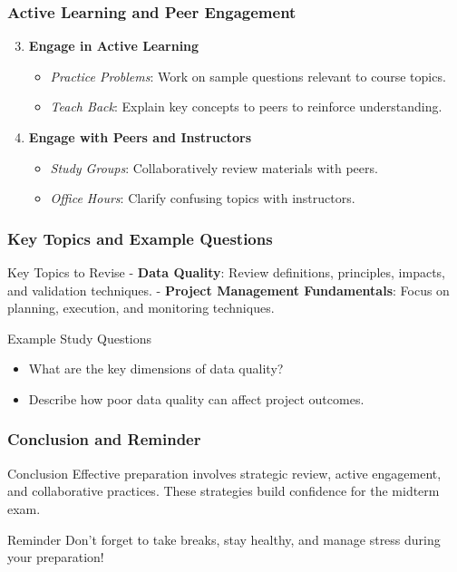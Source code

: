 \documentclass[aspectratio=169]{beamer}
\begin{document}
\begin{frame}[fragile]
    \frametitle{Active Learning and Peer Engagement}
    \begin{enumerate}
        \setcounter{enumi}{2}
        \item \textbf{Engage in Active Learning}
            \begin{itemize}
                \item \textit{Practice Problems}: Work on sample questions relevant to course topics.
                \item \textit{Teach Back}: Explain key concepts to peers to reinforce understanding.
            \end{itemize}        
        \item \textbf{Engage with Peers and Instructors}
            \begin{itemize}
                \item \textit{Study Groups}: Collaboratively review materials with peers.
                \item \textit{Office Hours}: Clarify confusing topics with instructors.
            \end{itemize}
    \end{enumerate}
\end{frame}

\begin{frame}[fragile]
    \frametitle{Key Topics and Example Questions}
    \begin{block}{Key Topics to Revise}
        - \textbf{Data Quality}: Review definitions, principles, impacts, and validation techniques.
        - \textbf{Project Management Fundamentals}: Focus on planning, execution, and monitoring techniques.
    \end{block}

    \begin{block}{Example Study Questions}
        \begin{itemize}
            \item What are the key dimensions of data quality?
            \item Describe how poor data quality can affect project outcomes.
        \end{itemize}
    \end{block}
\end{frame}

\begin{frame}[fragile]
    \frametitle{Conclusion and Reminder}
    \begin{block}{Conclusion}
        Effective preparation involves strategic review, active engagement, and collaborative practices. These strategies build confidence for the midterm exam.
    \end{block}
    
    \begin{block}{Reminder}
        Don’t forget to take breaks, stay healthy, and manage stress during your preparation!
    \end{block}
\end{frame}
\end{document}
